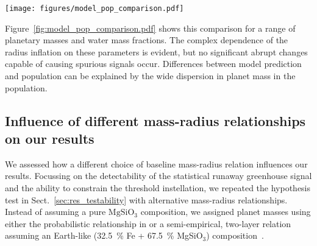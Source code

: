 \documentclass[twocolumn,twocolappendix]{aastex631}
\begin{document}
\begin{figure*}[ht!]
    \begin{centering}
        \texttt{[image: figures/model\_pop\_comparison.pdf]}
        \caption{
        Comparison of radius and bulk density changes predicted by the atmospheric models to the average changes measured in the synthetic planet population.
        Model predictions $\Delta R_\mathrm{model}$ and $\Delta \rho_\mathrm{model}$ depend on individual planet masses; $\langle \Delta R_\mathrm{population} \rangle$ and $\langle \Delta \rho_\mathrm{population} \rangle$ are averaged measurements of the overall population.
        Significant differences are thus expected.
        }
        \label{fig:model_pop_comparison.pdf}
    \end{centering}
\end{figure*}
Figure~\ref{fig:model_pop_comparison.pdf} shows this comparison for a range of planetary masses and water mass fractions.
The complex dependence of the radius inflation on these parameters is evident, but no significant abrupt changes capable of causing spurious signals occur.
Differences between model prediction and population can be explained by the wide dispersion in planet mass in the population.



\subsection{Influence of different mass-radius relationships on our results}\label{app:MR_relation}
We assessed how a different choice of baseline mass-radius relation influences our results.
Focussing on the detectability of the statistical runaway greenhouse signal and the ability to constrain the threshold instellation, we repeated the hypothesis test in Sect.~\ref{sec:res_testability} with alternative mass-radius relationships.
Instead of assuming a pure $\mathrm{MgSiO_3}$ composition, we assigned planet masses using either the probabilistic relationship in \citet{Wolfgang2016} or a semi-empirical, two-layer relation assuming an Earth-like (\SI{32.5}{\percent} Fe + \SI{67.5}{\percent} MgSiO$_3$) composition~\citep{Zeng2016}.
\end{document}
